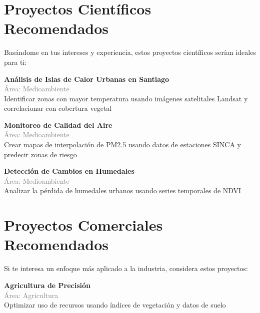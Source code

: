 \documentclass[11pt,a4paper]{article}
\begin{document}
\section*{ Proyectos Científicos Recomendados}

Basándome en tus intereses y experiencia, estos proyectos científicos serían ideales para ti:


\begin{tcolorbox}[colback=green!5,colframe=darkgreen,title={\small Proyecto Científico \#1}]
\textbf{Análisis de Islas de Calor Urbanas en Santiago}\\[0.2cm]
\textcolor{gray}{\small Área: Medioambiente}\\[0.2cm]
Identificar zonas con mayor temperatura usando imágenes satelitales Landsat y correlacionar con cobertura vegetal
\end{tcolorbox}


\begin{tcolorbox}[colback=green!5,colframe=darkgreen,title={\small Proyecto Científico \#2}]
\textbf{Monitoreo de Calidad del Aire}\\[0.2cm]
\textcolor{gray}{\small Área: Medioambiente}\\[0.2cm]
Crear mapas de interpolación de PM2.5 usando datos de estaciones SINCA y predecir zonas de riesgo
\end{tcolorbox}


\begin{tcolorbox}[colback=green!5,colframe=darkgreen,title={\small Proyecto Científico \#3}]
\textbf{Detección de Cambios en Humedales}\\[0.2cm]
\textcolor{gray}{\small Área: Medioambiente}\\[0.2cm]
Analizar la pérdida de humedales urbanos usando series temporales de NDVI
\end{tcolorbox}


\section*{ Proyectos Comerciales Recomendados}

Si te interesa un enfoque más aplicado a la industria, considera estos proyectos:


\begin{tcolorbox}[colback=orange!5,colframe=darkorange,title={\small Proyecto Comercial \#1}]
\textbf{Agricultura de Precisión}\\[0.2cm]
\textcolor{gray}{\small Área: Agricultura}\\[0.2cm]
Optimizar uso de recursos usando índices de vegetación y datos de suelo
\end{tcolorbox}
\end{document}

